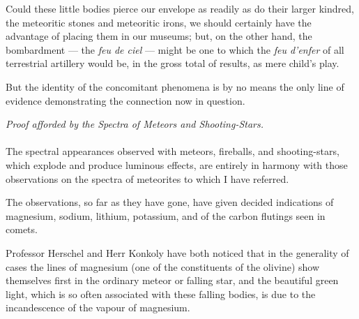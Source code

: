 \documentclass[a4paper, 12pt, oneside, polutonikogreek, english]{article}
\begin{document}
Could these little bodies pierce our envelope as readily as do their larger kindred, the meteoritic stones and meteoritic irons, we should certainly have the advantage of placing them in our museums; but, on the other hand, the bombardment --- the \emph{feu de ciel} --- might be one to which the \emph{feu d'enfer} of all terrestrial artillery would be, in the gross total of results, as mere child's play.

But the identity of the concomitant phenomena is by no means the only line of evidence demonstrating the connection now in question.
\begin{center}
\emph{Proof afforded by the Spectra of Meteors and Shooting-Stars.}
\end{center}
\paragraph{}
The spectral appearances observed with meteors, fireballs, and shooting-stars, which explode and produce luminous effects, are entirely in harmony with those observations on the spectra of meteorites to which I have referred.

The observations, so far as they have gone, have given decided indications of magnesium, sodium, lithium, potassium, and of the carbon flutings seen in comets.

Professor Herschel and Herr Konkoly have both noticed that in the generality of cases the lines of magnesium (one of the constituents of the olivine) show themselves first in the ordinary meteor or falling star, and the beautiful green light, which is so often associated with these falling bodies, is due to the incandescence of the vapour of magnesium.
\end{document}
